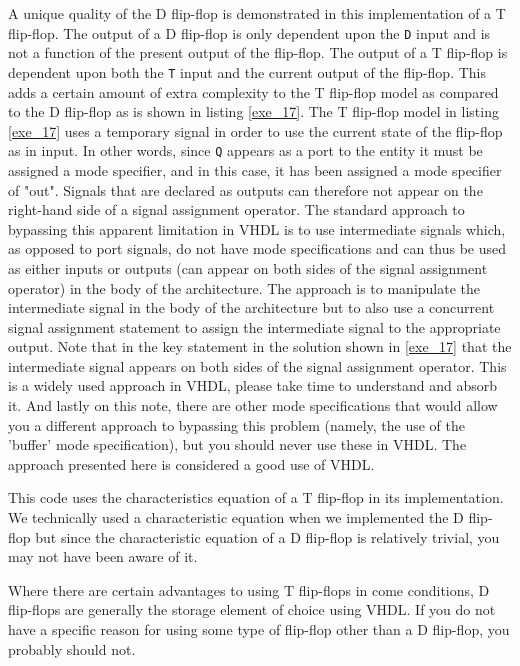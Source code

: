 \begin{my_list}
\item A unique quality of the D flip-flop is demonstrated in this implementation of a T flip-flop. The output of a D flip-flop is only dependent upon the \texttt{D} input and is not a function of the present output of the flip-flop. The output of a T flip-flop is dependent upon both the \texttt{T} input and the current output of the flip-flop. This adds a certain amount of extra complexity to the T flip-flop model as compared to the D flip-flop as is shown in listing \ref{exe_17}. The T flip-flop model in listing \ref{exe_17} uses a temporary signal in order to use the current state of the flip-flop as in input. In other words, since \texttt{Q} appears as a port to the entity it must be assigned a mode specifier, and in this case, it has been assigned a mode specifier of "out". Signals that are declared as outputs can therefore not appear on the right-hand side of a signal assignment operator. The standard approach to bypassing this apparent limitation in VHDL is to use intermediate signals which, as opposed to port signals, do not have mode specifications and can thus be used as either inputs or outputs (can appear on both sides of the signal assignment operator) in the body of the architecture. The approach is to manipulate the intermediate signal in the body of the architecture but to also use a concurrent signal assignment statement to assign the intermediate signal to the appropriate output. Note that in the key statement in the solution shown in \ref{exe_17} that the intermediate signal appears on both sides of the signal assignment operator. This is a widely used approach in VHDL, please take time to understand and absorb it. And lastly on this note, there are other mode specifications that would allow you a different approach to bypassing this problem (namely, the use of the 'buffer' mode specification), but you should never use these in VHDL. The approach presented here is considered a good use of VHDL. 

\item This code uses the characteristics equation of a T flip-flop in its implementation. We technically used a characteristic equation when we implemented the D flip-flop but since the characteristic equation of a D flip-flop is relatively trivial, you may not have been aware of it.
\item Where there are certain advantages to using T flip-flops in come conditions, D flip-flops are generally the storage element of choice using VHDL. If you do not have a specific reason for using some type of flip-flop other than a D flip-flop, you probably should not. 
\end{my_list}

